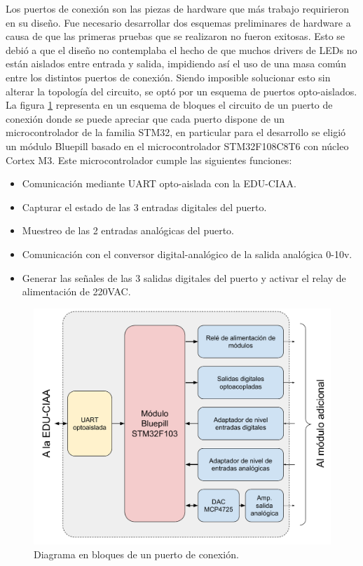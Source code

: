 Los puertos de conexión son las piezas de hardware que más trabajo requirieron en su diseño. Fue necesario desarrollar dos esquemas preliminares de hardware a causa de que las primeras pruebas que se realizaron no fueron exitosas. Esto se debió a que el diseño no contemplaba el hecho de que muchos drivers de LEDs no están aislados entre entrada y salida, impidiendo así el uso de una masa común entre los distintos puertos de conexión. Siendo imposible solucionar esto sin alterar la topología del circuito, se optó por un esquema de puertos opto-aislados. La figura \ref{fig:BloquesPuerto} representa en un esquema de bloques el circuito de un puerto de conexión donde se puede apreciar que cada puerto dispone de un microcontrolador de la familia STM32, en particular para el desarrollo se eligió un módulo Bluepill basado en el microcontrolador STM32F108C8T6 con núcleo Cortex M3. Este microcontrolador cumple las siguientes funciones:

\begin{itemize}
	\item Comunicación mediante UART opto-aislada con la EDU-CIAA.
	\item Capturar el estado de las 3 entradas digitales del puerto.
	\item Muestreo de las 2 entradas analógicas del puerto.
	\item Comunicación con el conversor digital-analógico de la salida analógica 0-10v.
	\item Generar las señales de las 3 salidas digitales del puerto y activar el relay de alimentación de 220VAC.
\end{itemize}

\begin{figure}[ht]
	\centering
	\includegraphics[width=1\textwidth]{./Figures/BloquesPuerto.pdf}
	\caption{Diagrama en bloques de un puerto de conexión.}
	\label{fig:BloquesPuerto}
\end{figure}


